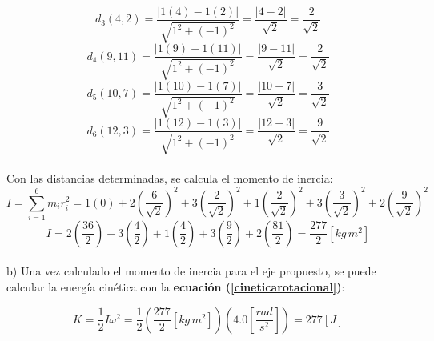 \documentclass[letter,oneside,11pt]{article}
\begin{document}
\begin{minipage}[b]{.9\linewidth}
\begin{equation*}
    d_3(4,2) = \frac{| 1 (4) - 1 (2) |}{\sqrt{1^2 + (-1)^2}} = \frac{|4 - 2|}{\sqrt{2}} = \frac{2}{\sqrt{2}}
\end{equation*}
\begin{equation*}
    d_4(9,11) = \frac{| 1 (9) - 1 (11) |}{\sqrt{1^2 + (-1)^2}} = \frac{|9 - 11|}{\sqrt{2}} = \frac{2}{\sqrt{2}}
\end{equation*}
\begin{equation*}
    d_5(10,7) = \frac{| 1 (10) - 1 (7) |}{\sqrt{1^2 + (-1)^2}} = \frac{|10 - 7|}{\sqrt{2}} = \frac{3}{\sqrt{2}}
\end{equation*}
\begin{equation*}
    d_6(12,3) = \frac{| 1 (12) - 1 (3) |}{\sqrt{1^2 + (-1)^2}} = \frac{|12 - 3|}{\sqrt{2}} = \frac{9}{\sqrt{2}}
\end{equation*}
\\

Con las distancias determinadas, se calcula el momento de inercia:
\begin{equation*}
    I = \sum_{i=1}^{6} m_i r^2_i = 1 (0) + 2\left(\frac{6}{\sqrt{2}}\right)^2 + 3\left(\frac{2}{\sqrt{2}}\right)^2 + 1\left(\frac{2}{\sqrt{2}}\right)^2 + 3\left(\frac{3}{\sqrt{2}}\right)^2 + 2\left(\frac{9}{\sqrt{2}}\right)^2
\end{equation*}
\begin{equation*}
    I = 2 \left(\frac{36}{2}\right) + 3 \left(\frac{4}{2}\right) + 1 \left(\frac{4}{2}\right) + 3 \left(\frac{9}{2}\right) + 2 \left(\frac{81}{2}\right) = \frac{277}{2} [kg\, m^2]
\end{equation*}
\\

b) Una vez calculado el momento de inercia para el eje propuesto, se puede
calcular la energía cinética con la \textbf{ecuación
(\ref{cineticarotacional})}:

\begin{equation*}
    K = \frac{1}{2} I \omega^2 =  \frac{1}{2} \left(\frac{277}{2} [kg\, m^2]\right) \left(4.0 \left[\frac{rad}{s^2}\right]\right) = 277 [J]
\end{equation*}
\end{minipage}
\end{document}
